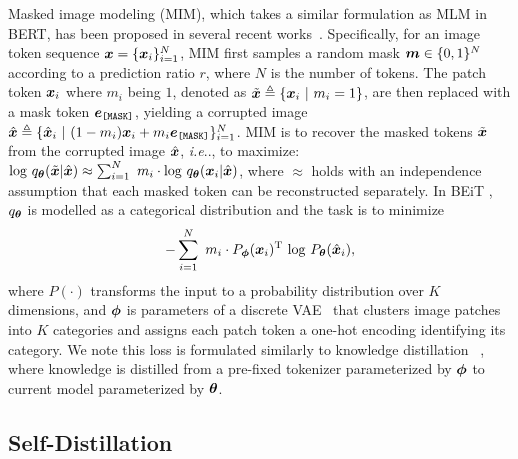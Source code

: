 \documentclass{article} %
\makeatletter
\DeclareRobustCommand\onedot{\futurelet\@let@token\@onedot}
\def\@onedot{\ifx\@let@token.\else.\null\fi\xspace}
\def\ie{\emph{i.e}\onedot} \def\Ie{\emph{I.e}\onedot}
\makeatother
\begin{document}
Masked image modeling (MIM), which takes a similar formulation as MLM in BERT, has been proposed in several recent works~\citep{beit, vimpac}. Specifically, for an image token sequence ${\bm{x}} = \{{\bm{x}}_i\}_{i=1}^N$, MIM first samples a random mask ${\bm{m}} \in \{0,1\}^N$ according to a prediction ratio $r$, where $N$ is the number of tokens. The patch token ${\bm{x}}_i$ where $m_i$ being $1$, denoted as $\tilde {{\bm{x}}} \triangleq  \{{\bm{x}}_i \ | \ m_i = 1\}$, are then replaced with a mask token ${\bm{e}}_\texttt{[MASK]}$, yielding a corrupted image $\hat \vx \triangleq \{\hat \vx_i \ | \ (1-m_i) \vx_i + m_i \ve_\texttt{[MASK]}\}_{i=1}^N$. MIM is to recover the masked tokens $\tilde {{\bm{x}}}$  from the corrupted image $\hat {{\bm{x}}} $, \ie, to maximize: $\mathrm{log} \ q_\vtheta(\tilde \vx| \hat \vx) \approx \sum_{i=1}^N \ m_i \cdot \mathrm{log} \ q_\vtheta(\vx_i|\hat \vx)$,
where $\approx$ holds with an independence assumption that each masked token can be reconstructed separately.
In BEiT \citep{beit}, $q_{\bm{\theta}}$ is modelled as a categorical distribution and the task is to minimize
\begin{equation}
\label{eq:lbeit}
-\sum_{i=1}^N \ m_i \cdot P_\vphi(\vx_i)^\mathrm{T} \ \mathrm{log} \ P_\vtheta(\hat \vx_i),
\end{equation}
where $P(\cdot)$ transforms the input to a probability distribution over $K$ dimensions, and ${\bm{\phi}}$ is parameters of a discrete VAE~\citep{dalle} that clusters image patches into $K$ categories and assigns each patch token a one-hot encoding identifying its category.
We note this loss is formulated similarly to knowledge distillation ~\citep{distill}, where knowledge is distilled from a pre-fixed tokenizer parameterized by ${\bm{\phi}}$ to current model parameterized by ${\bm{\theta}}$.

\subsection{Self-Distillation}
\end{document}

